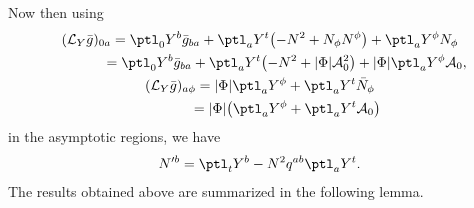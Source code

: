  Now then using
 \begin{gather*}
 	(\mathcal{L}_Y \bar{g})_{0a} =\ptl_0 Y^b \bar{g}_{ba} + \ptl_a Y^t \bigl(-N^2 + N_\phi N^\phi\bigr) + \ptl_a Y^\phi N_\phi \notag\\
 	\hphantom{(\mathcal{L}_Y \bar{g})_{0a} }{}
 = \ptl_0 Y^b \bar{g}_{ba} + \ptl_a Y^t \bigl(- N^2 + \vert \Phi\vert\mathcal{A}^2_0\bigr) + \vert \Phi \vert \ptl_a Y^\phi \mathcal{A}_0,
\\
 	(\mathcal{L}_{Y} \bar{g})_{a \phi} = \vert \Phi \vert \ptl_a Y^\phi + \ptl_a Y^t \bar{N}_\phi \notag\\
 	\hphantom{(\mathcal{L}_{Y} \bar{g})_{a \phi}}{}
 = \vert \Phi\vert \bigl(\ptl_a Y^\phi + \ptl_a Y^t \mathcal{A}_0\bigr)
 	\end{gather*}
 in the asymptotic regions, we have
 \begin{align} \label{pert-shift}
 	N'^b = \ptl_t Y^b - N^2 q^{ab} \ptl_a Y^t.
 \end{align}
The results obtained above are summarized in the following lemma.

